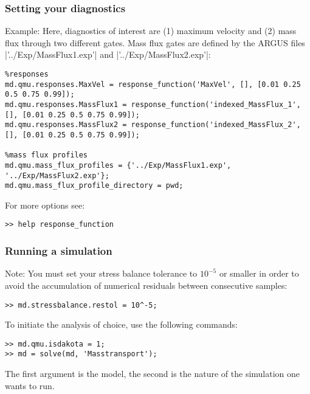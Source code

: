 \subsubsection{Setting your diagnostics}
Example: Here, diagnostics of interest are (1) maximum velocity and (2) mass flux through two different gates. Mass flux gates are defined by the ARGUS files \lstinlinebg|'../Exp/MassFlux1.exp'| and \lstinlinebg|'../Exp/MassFlux2.exp'|:
\begin{lstlisting}
%responses
md.qmu.responses.MaxVel = response_function('MaxVel', [], [0.01 0.25 0.5 0.75 0.99]);
md.qmu.responses.MassFlux1 = response_function('indexed_MassFlux_1', [], [0.01 0.25 0.5 0.75 0.99]);
md.qmu.responses.MassFlux2 = response_function('indexed_MassFlux_2', [], [0.01 0.25 0.5 0.75 0.99]);

%mass flux profiles
md.qmu.mass_flux_profiles = {'../Exp/MassFlux1.exp', '../Exp/MassFlux2.exp'};
md.qmu.mass_flux_profile_directory = pwd;
\end{lstlisting}

For more options see:
\begin{lstlisting}
>> help response_function
\end{lstlisting}

\subsubsection{Running a simulation}
Note: You must set your stress balance tolerance to $10^{-5}$ or smaller in order to avoid the accumulation of numerical residuals between consecutive samples:
\begin{lstlisting}
>> md.stressbalance.restol = 10^-5;
\end{lstlisting}

To initiate the analysis of choice, use the following commands:
\begin{lstlisting}
>> md.qmu.isdakota = 1;
>> md = solve(md, 'Masstransport');
\end{lstlisting}
The first argument is the model, the second is the nature of the simulation one wants to run.

\clearpage %
